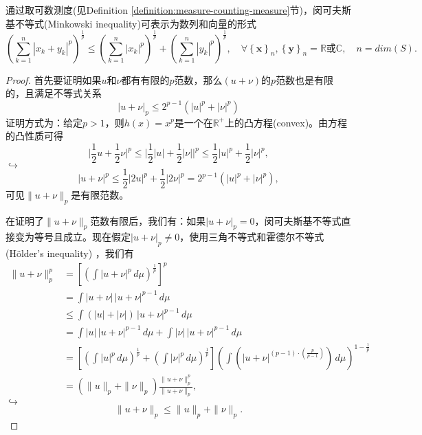 \begin{definition}[闵可夫斯基不等式]
  \label{sec:minkowski-ineq-def}
通过取可数测度(见Definition \ref{definition:measure-counting-measure}节)，闵可夫斯基不等式(Minkowski inequality)可表示为数列和向量的形式
\begin{equation*}
  \left( \sum_{k=1}^{n} | x_k + y_k | ^p \right)^{\frac{1}{p}}
  \le \left( \sum_{k=1}^{n} | x_k | ^p \right)^{\frac{1}{p}}
  + \left( \sum_{k=1}^{n} | y_k | ^p \right)^{\frac{1}{p}}, \quad \forall \left\{ \bm{x} \right\}_{n}, \left\{ \bm{y} \right\}_{n} = \mathbb{R}\text{或}\mathbb{C}, \quad n=dim(S).
\end{equation*}
\begin{proof}
首先要证明如果$u$和$\nu$都有有限的$p$范数，那么$(u+\nu)$的$p$范数也是有限的，且满足不等式关系
\begin{equation*}
  | u + \nu |_p \le 2^{p-1} \left( |u| ^{p} + |\nu| ^{p}\right)
\end{equation*}
证明方式为：给定$p>1$，则$h(x) = x^p$是一个在$\mathbb{R}^{+}$上的凸方程(convex)。由方程的凸性质可得
\begin{equation*}
  \big| \frac{1}{2} u + \frac{1}{2} \nu \big|^p
  \le \big|\frac{1}{2} |u| + \frac{1}{2} |\nu| \big|^p
  \le \frac{1}{2} |u|^p + \frac{1}{2} |\nu|^p,
\end{equation*}
$\hookrightarrow$
\begin{equation*}
  \big| u + \nu \big|^p \le \frac{1}{2} |2u|^p + \frac{1}{2} |2\nu|^p
  = 2^{p-1} \left( |u|^p + |\nu|^p \right),
\end{equation*}
可见$\|u+\nu\|_p$是有限范数。

在证明了$\|u+\nu\|_p$范数有限后，我们有：如果$|u + \nu|_p=0$，闵可夫斯基不等式直接变为等号且成立。现在假定$|u + \nu|_p \neq 0$，使用三角不等式和霍德尔不等式(Hölder's inequality) ，我们有
\begin{equation*}
\begin{split}
    \|u + \nu \|_p^p &= \left[ \left( \int |u + \nu|^p \, d \mu \right)^{\frac{1}{p}} \right]^{p} \\
    &= \int |u + \nu| \, |u + \nu|^{p-1} \, d \mu \\
    &\le \int \left( |u| + |\nu| \right) \, |u + \nu|^{p-1} \, d \mu\\
    & = \int |u| \, |u + \nu|^{p-1} \, d \mu + \int |\nu| \, |u + \nu|^{p-1} \, d \mu \\
    &=\left[ \left( \int |u|^p \, d \mu \right)^{\frac{1}{p}}  + \left( \int |\nu|^p \, d \mu \right)^{\frac{1}{p}}\right] \left(
    \int \left( \big| u + \nu \big|^{\left(p-1\right) \cdot \left( \frac{p}{p-1} \right)}  \right) \, d \mu
    \right)^{1-\frac{1}{p}}\\
    &= \left( \|u \|_p + \| \nu \|_p \right) \frac{\|u+\nu\|_{p}^{p}}{\| u + \nu \|_p},
\end{split}
\end{equation*}
$\hookrightarrow$
\begin{equation*}
  \| u + \nu \|_p \le \|u \|_p + \| \nu \|_p.
\end{equation*}
\end{proof}
\end{definition}

